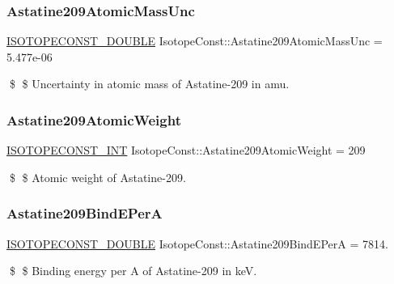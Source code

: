 \subsubsection{\texorpdfstring{Astatine209\+Atomic\+Mass\+Unc}{Astatine209AtomicMassUnc}}
{\footnotesize\ttfamily \mbox{\hyperlink{group___isotope_const-_macros_ga8f45a7272ce02c0b4c65c44636ed719a}{I\+S\+O\+T\+O\+P\+E\+C\+O\+N\+S\+T\+\_\+\+D\+O\+U\+B\+LE}} Isotope\+Const\+::\+Astatine209\+Atomic\+Mass\+Unc = 5.\+477e-\/06}

\$ \$ Uncertainty in atomic mass of Astatine-\/209 in amu. \mbox{\label{group___isotope_const-_astatine-_at209_ga561a38fd20f1b991e9db81e6a3d21142}} 
\subsubsection{\texorpdfstring{Astatine209\+Atomic\+Weight}{Astatine209AtomicWeight}}
{\footnotesize\ttfamily \mbox{\hyperlink{group___isotope_const-_macros_ga5f18360b3e99483a35c32d789e62621c}{I\+S\+O\+T\+O\+P\+E\+C\+O\+N\+S\+T\+\_\+\+I\+NT}} Isotope\+Const\+::\+Astatine209\+Atomic\+Weight = 209}

\$ \$ Atomic weight of Astatine-\/209. \mbox{\label{group___isotope_const-_astatine-_at209_gaf267efc5eba022ae8ef32b0286e60234}} 
\subsubsection{\texorpdfstring{Astatine209\+Bind\+E\+PerA}{Astatine209BindEPerA}}
{\footnotesize\ttfamily \mbox{\hyperlink{group___isotope_const-_macros_ga8f45a7272ce02c0b4c65c44636ed719a}{I\+S\+O\+T\+O\+P\+E\+C\+O\+N\+S\+T\+\_\+\+D\+O\+U\+B\+LE}} Isotope\+Const\+::\+Astatine209\+Bind\+E\+PerA = 7814.}

\$ \$ Binding energy per A of Astatine-\/209 in keV. \mbox{\label{group___isotope_const-_astatine-_at209_ga2c815dd4c2432db913c6da274baa5c3c}} 
